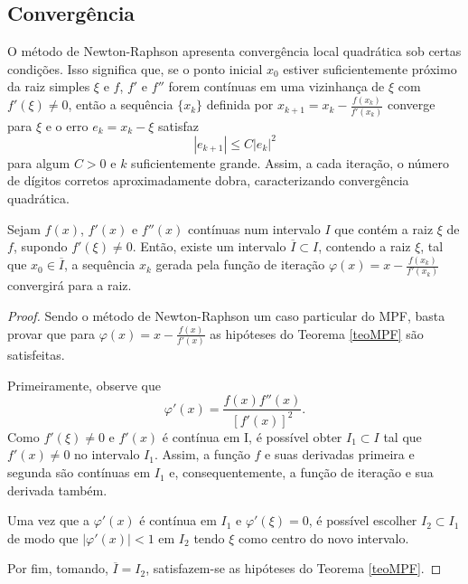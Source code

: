 \subsection{Convergência}
O método de Newton-Raphson apresenta convergência local quadrática sob certas
condições. Isso significa que, se o ponto inicial $x_0$ estiver suficientemente
próximo da raiz simples $\xi$ e $f$, $f'$ e $f''$ forem contínuas em uma
vizinhança de $\xi$ com $f'(\xi) \neq 0$, então a sequência $\{x_k\}$ definida
por $x_{k+1} = x_k - \frac{f(x_k)}{f'(x_k)}$ converge para $\xi$ e o erro
$e_{k} = x_k - \xi$ satisfaz
\[
    |e_{k+1}| \leq C |e_k|^2
\]
para algum $C > 0$ e $k$ suficientemente grande. Assim, a cada iteração, o
número de dígitos corretos aproximadamente dobra, caracterizando convergência
quadrática.
\begin{teo} \label{teoNR}
    Sejam $f(x)$, $f'(x)$ e $f''(x)$ contínuas num intervalo $I$ que contém a raiz $\xi$ de $f$, supondo $f'(\xi) \neq 0$. Então, existe um intervalo $\overline{I} \subset I$, contendo a raiz $\xi$, tal que $x_0 \in \overline{I}$, a sequência ${x_k}$ gerada pela função de iteração $\varphi(x) = x - \frac{f(x_k)}{f'(x_k)}$ convergirá para a raiz.
\end{teo}
\begin{proof}
    Sendo o método de Newton-Raphson um caso particular do MPF, basta provar que para $\varphi(x) = x - \frac{f(x)}{f'(x)}$ as hipóteses do Teorema \ref{teoMPF} são satisfeitas.

    Primeiramente, observe que
    \begin{equation} \label{dphiNR}
        \varphi'(x) = \frac{f(x)f''(x)}{[f'(x)]^2}.
    \end{equation}
    Como $f'(\xi) \neq 0$ e $f'(x)$ é contínua em I, é possível obter $I_1 \subset I$ tal que $f'(x) \neq 0$ no intervalo $I_1$. Assim, a função $f$ e suas derivadas primeira e segunda são contínuas em $I_1$ e, consequentemente, a função de iteração e sua derivada também.

    Uma vez que a $\varphi'(x)$ é contínua em $I_1$ e $\varphi'(\xi) = 0$, é
    possível escolher $I_2 \subset I_1$ de modo que $|\varphi'(x)| < 1$ em $I_2$
    tendo $\xi$ como centro do novo intervalo.

    Por fim, tomando, $\overline{I} = I_2$, satisfazem-se as hipóteses do Teorema
    \ref{teoMPF}.
\end{proof}
